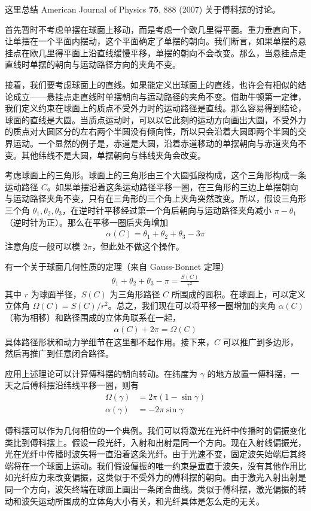 \documentclass[12pt,a4paper,UTF8]{ctexart}
\begin{document}
这里总结 American Journal of Physics \textbf{75}, 888 (2007) 关于傅科摆的讨论。

首先暂时不考虑单摆在球面上移动，而是考虑一个欧几里得平面。重力垂直向下，让单摆在一个平面内摆动，这个平面确定了单摆的朝向。我们断言，如果单摆的悬挂点在欧几里得平面上沿直线缓慢平移，单摆的朝向不会改变。那么，当悬挂点走直线时单摆的朝向与运动路径方向的夹角不变。

接着，我们要考虑球面上的直线。如果能定义出球面上的直线，也许会有相似的结论成立——悬挂点走直线时单摆朝向与运动路径的夹角不变。借助牛顿第一定律，我们定义约束在球面上的质点不受外力时的运动路径是直线。那么容易得到结论，球面的直线是大圆。当质点运动时，可以以它此刻的运动方向画出大圆，不受外力的质点对大圆区分的左右两个半圆没有倾向性，所以只会沿着大圆即两个半圆的交界运动。一个显然的例子是，赤道是大圆，沿着赤道移动的单摆朝向与赤道夹角不变。其他纬线不是大圆，单摆朝向与纬线夹角会改变。

考虑球面上的三角形。球面上的三角形由三个大圆弧段构成，这个三角形构成一条运动路径 $C$。如果单摆沿着这条运动路径平移一圈，在三角形的三边上单摆朝向与运动路径夹角不变，只有在三角形的三个角上夹角突然改变。所以，假设三角形三个角 $\theta_1,\theta_2,\theta_3$，在逆时针平移经过第一个角后朝向与运动路径夹角减小 $\pi - \theta_1$（逆时针为正）。那么在平移一圈后夹角增加
\begin{align}
    \alpha(C) =  \theta_1 + \theta_2 + \theta_3 - 3\pi
\end{align}
注意角度一般可以模 $2\pi$，但此处不做这个操作。

有一个关于球面几何性质的定理（来自 Gauss-Bonnet 定理）
\begin{align}
    \theta_1 + \theta_2 + \theta_3 - \pi = \frac{S(C)}{r^2}
\end{align}
其中 $r$ 为球面半径，$S(C)$ 为三角形路径 $C$ 所围成的面积。在球面上，可以定义立体角 $\Omega(C) = S(C)/r^2$。总之，我们现在可以将平移一圈增加的夹角 $\alpha(C)$（称为相移）和路径围成的立体角联系在一起，
\begin{align}
    \alpha(C) + 2\pi = \Omega(C)
\end{align}
具体路径形状和动力学细节在这里都不起作用。接下来，$C$ 可以推广到多边形，然后再推广到任意闭合路径。

应用上述理论可以计算傅科摆的朝向转动。在纬度为 $\gamma$ 的地方放置一傅科摆，一天之后傅科摆沿纬线平移一圈，则有
\begin{align}
    \Omega(\gamma) &= 2\pi (1 - \sin\gamma) \\
    \alpha(\gamma) &= -2\pi\sin\gamma
\end{align}

傅科摆可以作为几何相位的一个典例。我们可以将激光在光纤中传播时的偏振变化类比到傅科摆上。假设一段光纤，入射和出射是同一个方向。现在入射线偏振光，光在光纤中传播时波矢将一直沿着这条光纤。由于光速不变，固定波矢始端后其终端将在一个球面上运动。我们假设偏振的唯一约束是垂直于波矢，没有其他作用比如光纤应力来改变偏振，这类似于不受外力的傅科摆的朝向。由于激光入射出射是同一个方向，波矢终端在球面上画出一条闭合曲线。类似于傅科摆，激光偏振的转动和波矢运动所围成的立体角大小有关，和光纤具体是怎么走的无关。
\end{document}
